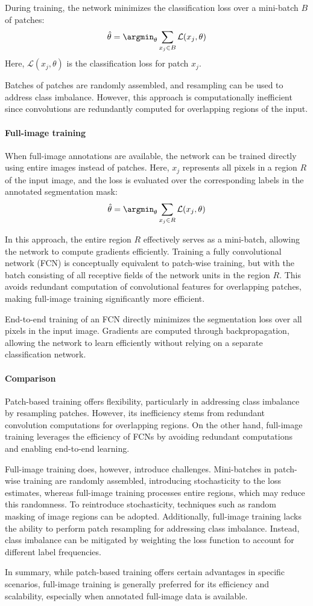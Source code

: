 During training, the network minimizes the classification loss over a mini-batch $B$ of patches:
\[\hat{\theta} = \argmin_{\theta} \sum_{x_j \in B} \mathcal{L}(x_j, \theta)\]
Here, $\mathcal{L}(x_j, \theta)$ is the classification loss for patch $x_j$.

Batches of patches are randomly assembled, and resampling can be used to address class imbalance. 
However, this approach is computationally inefficient since convolutions are redundantly computed for overlapping regions of the input.

\paragraph*{Full-image training}
When full-image annotations are available, the network can be trained directly using entire images instead of patches. 
Here, $x_j$ represents all pixels in a region $R$ of the input image, and the loss is evaluated over the corresponding labels in the annotated segmentation mask:
\[\hat{\theta} = \argmin_{\theta} \sum_{x_j \in R} \mathcal{L}(x_j, \theta)\]

In this approach, the entire region $R$ effectively serves as a mini-batch, allowing the network to compute gradients efficiently. 
Training a fully convolutional network (FCN) is conceptually equivalent to patch-wise training, but with the batch consisting of all receptive fields of the network units in the region $R$. 
This avoids redundant computation of convolutional features for overlapping patches, making full-image training significantly more efficient.

End-to-end training of an FCN directly minimizes the segmentation loss over all pixels in the input image. 
Gradients are computed through backpropagation, allowing the network to learn efficiently without relying on a separate classification network.

\paragraph*{Comparison}
Patch-based training offers flexibility, particularly in addressing class imbalance by resampling patches. 
However, its inefficiency stems from redundant convolution computations for overlapping regions. 
On the other hand, full-image training leverages the efficiency of FCNs by avoiding redundant computations and enabling end-to-end learning. 

Full-image training does, however, introduce challenges. 
Mini-batches in patch-wise training are randomly assembled, introducing stochasticity to the loss estimates, whereas full-image training processes entire regions, which may reduce this randomness. 
To reintroduce stochasticity, techniques such as random masking of image regions can be adopted. 
Additionally, full-image training lacks the ability to perform patch resampling for addressing class imbalance. 
Instead, class imbalance can be mitigated by weighting the loss function to account for different label frequencies.

In summary, while patch-based training offers certain advantages in specific scenarios, full-image training is generally preferred for its efficiency and scalability, especially when annotated full-image data is available.